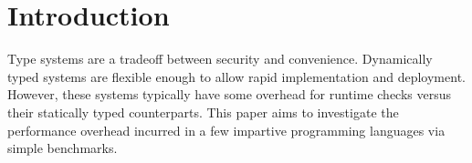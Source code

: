 \section{Introduction}
Type systems are a tradeoff between security and convenience. Dynamically typed systems are flexible enough to allow rapid implementation and deployment. However, these systems typically have some overhead for runtime checks versus their statically typed counterparts. This paper aims to investigate the  performance overhead incurred in a few impartive programming languages via simple benchmarks.

